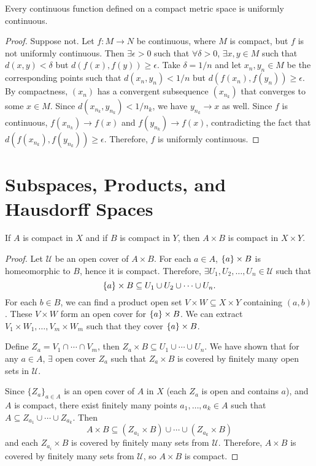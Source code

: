 \begin{prop}
    Every continuous function defined on a compact metric space is uniformly continuous.
    \begin{proof}
        Suppose not. Let $f: M\to N$ be continuous, where $M$ is compact, but $f$ is not uniformly continuous. Then $\exists \epsilon > 0$ such that $\forall \delta > 0$, $\exists x, y \in M$ such that $d(x, y) < \delta$ but $d(f(x), f(y)) \geq \epsilon$. Take $\delta = 1/n$ and let $x_n, y_n \in M$ be the corresponding points such that $d(x_n, y_n) < 1/n$ but $d(f(x_n), f(y_n)) \geq \epsilon$. By compactness, $(x_n)$ has a convergent subsequence $(x_{n_k})$ that converges to some $x\in M$. Since $d(x_{n_k}, y_{n_k}) < 1/n_k$, we have $y_{n_k} \to x$ as well. Since $f$ is continuous, $f(x_{n_k}) \to f(x)$ and $f(y_{n_k}) \to f(x)$, contradicting the fact that $d(f(x_{n_k}), f(y_{n_k})) \geq \epsilon$. Therefore, $f$ is uniformly continuous.
    \end{proof}
\end{prop}

\section{Subspaces, Products, and Hausdorff Spaces}

\begin{prop}
    If $A$ is compact in $X$ and if $B$ is compact in $Y$, then $A \times B$ is compact in $X \times Y$.
    \begin{proof}
        Let $\mathcal U$ be an open cover of $A \times B$. For each $a\in A$, ${\left\{{a}\right\}} \times B$ is homeomorphic to $B$, hence it is compact. Therefore, $\exists U_1, U_2, \ldots, U_n \in \mathcal U$ such that
        \[
        {\left\{{a}\right\}} \times B \subseteq U_1 \cup U_2 \cup \cdots \cup U_n.
        \]
        For each $b\in B$, we can find a product open set $V\times W \subseteq X\times Y$ containing $(a, b)$. These $V\times W$ form an open cover for ${\left\{{a}\right\}} \times B$. We can extract $V_1\times W_1, \ldots, V_m\times W_m$ such that they cover ${\left\{{a}\right\}} \times B$. 

        Define $Z_a = V_1 \cap \cdots \cap V_m$, then $Z_a \times B \subseteq U_1 \cup \cdots \cup U_n$. We have shown that for any $a\in A$, $\exists$ open cover $Z_a$ such that $Z_a \times B$ is covered by finitely many open sets in $\mathcal U$. 

        Since $\{Z_a\}_{a\in A}$ is an open cover of $A$ in $X$ (each $Z_a$ is open and contains $a$), and $A$ is compact, there exist finitely many points $a_1, \ldots, a_k \in A$ such that $A \subseteq Z_{a_1} \cup \cdots \cup Z_{a_k}$. Then
        \[
        A \times B \subseteq (Z_{a_1} \times B) \cup \cdots \cup (Z_{a_k} \times B)
        \]
        and each $Z_{a_i} \times B$ is covered by finitely many sets from $\mathcal U$. Therefore, $A \times B$ is covered by finitely many sets from $\mathcal U$, so $A \times B$ is compact.
    \end{proof}
\end{prop}

